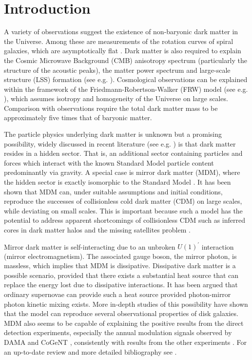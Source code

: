 \documentclass[12pt]{article}
\begin{document}
 \newpage

\section{Introduction}

A variety of observations suggest the existence of non-baryonic dark
matter in the Universe. Among these are measurements of the rotation
curves of spiral galaxies, which are asymptotically flat \cite{rubin}.
Dark matter is also required to explain the Cosmic Microwave Background
(CMB) anisotropy spectrum (particularly the structure of the acoustic
peaks), the matter power spectrum and large-scale structure (LSS)
formation (see e.g. \cite{refregier}). Cosmological observations can be
explained within the framework of the Friedmann-Robertson-Walker (FRW)
model (see e.g. \cite{dodelson}), which assumes isotropy and homogeneity
of the Universe on large scales. Comparison with observations require
the total dark matter mass to be approximately five times that of
baryonic matter.

The particle physics underlying dark matter is unknown but a promising
possibility, widely discussed in recent literature (see e.g.
\cite{feng,cline6,ringwald,broken}) is that dark matter resides in a
hidden sector. That is, an additional sector containing particles and
forces which interact with the known Standard Model particle content
predominantly via gravity. A special case is mirror dark matter (MDM),
where the hidden sector is exactly isomorphic to the Standard Model
\cite{fundamentalimproper}. It has been shown that MDM can, under
suitable assumptions and initial conditions, reproduce the successes of
collisionless cold dark matter (CDM) on large scales, while deviating on
small scales. This is important because such a model has the potential
to address apparent shortcomings of collisionless CDM such as inferred
cores in dark matter halos and the missing satellites problem
\cite{berezhiani,mirrormattertype}.

Mirror dark matter is self-interacting due to an unbroken $U(1) ^{'}$
interaction (mirror electromagnetism). The associated gauge boson, the
mirror photon, is massless, which implies that MDM is dissipative.
Dissipative dark matter is a possible scenario, provided that there
exists a substantial heat source that can replace the energy lost due to
dissipative interactions. It has been argued \cite{spheroidal} that
ordinary supernovae can provide such a heat source provided
photon-mirror photon kinetic mixing exists. More in-depth studies of
this possibility \cite{depth4} have shown that the model can reproduce
several observational properties of disk galaxies. MDM also seems to be
capable of explaining the positive results from the direct detection
experiments, especially the annual modulation signals observed by DAMA
\cite{dama1} and CoGeNT \cite{cogent}, consistently with results from
the other experiments \cite{dama,electronscattering}. For an up-to-date
review and more detailed bibliography see \cite{review}.
\end{document}

